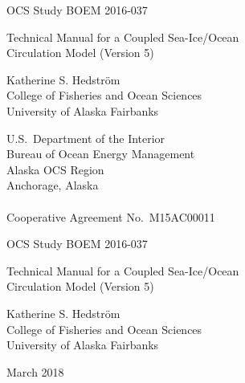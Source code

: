 %
%



\pagestyle{empty}
\centerline{\hfill OCS Study BOEM 2016-037}

\vspace {2 cm}
\begin{center}
  {\LARGE Technical Manual for a Coupled Sea-Ice/Ocean \\ Circulation
   Model (Version 5)  }
\end{center}
\vspace {2 cm}
\begin{center}
  Katherine S. Hedstr\"{o}m \\ College of Fisheries and Ocean Sciences
  \\ University of Alaska Fairbanks
\end{center}
\vspace {2 cm}
\begin{center}
  U.S.\ Department of the Interior \\ Bureau of Ocean Energy
  Management \\
  Alaska OCS Region \\
  Anchorage, Alaska \\ \mbox{} \\ Cooperative Agreement No.\ M15AC00011
\end{center}
\newpage

\centerline{\hfill OCS Study BOEM 2016-037}
\vspace {2 cm}
\begin{center}
  {\LARGE Technical Manual for a Coupled Sea-Ice/Ocean \\ Circulation
   Model (Version 5)  }
\end{center}
\vspace {2 cm}
\begin{center}
  Katherine S. Hedstr\"{o}m \\ College of Fisheries and Ocean Sciences
  \\ University of Alaska Fairbanks
\end{center}
\vspace {2 cm}
\centerline{March 2018}
\vfill


